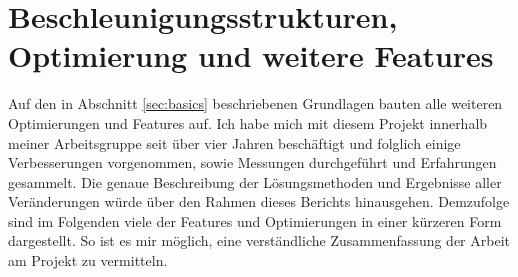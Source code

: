 \documentclass[crop=false]{standalone}
\begin{document}
  \section{Beschleunigungsstrukturen, Optimierung und weitere Features} %
  \label{sec:beschleunigungsstrukturen_optimierung_und_weitere_features}
    Auf den in Abschnitt \ref{sec:basics} beschriebenen Grundlagen bauten alle weiteren Optimierungen und Features auf.
    Ich habe mich mit diesem Projekt innerhalb meiner Arbeitsgruppe seit über vier Jahren beschäftigt und folglich einige Verbesserungen vorgenommen, sowie Messungen durchgeführt und Erfahrungen gesammelt.
    Die genaue Beschreibung der Lösungsmethoden und Ergebnisse aller Veränderungen würde über den Rahmen dieses Berichts hinausgehen.
    Demzufolge sind im Folgenden viele der Features und Optimierungen in einer kürzeren Form dargestellt.
    So ist es mir möglich, eine verständliche Zusammenfassung der Arbeit am Projekt zu vermitteln.
\end{document}
